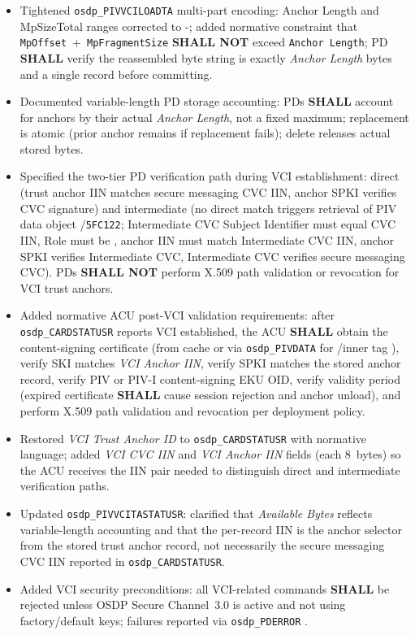 \begin{itemize}
    content-signing X.509 certificate.
  \item Tightened \texttt{osdp\_PIVVCILOADTA} multi-part encoding: Anchor Length and MpSizeTotal
    ranges corrected to -; added normative constraint that
    \texttt{MpOffset}~+~\texttt{MpFragmentSize} \textbf{SHALL NOT} exceed \texttt{Anchor Length}; PD
    \textbf{SHALL} verify the reassembled byte string is exactly \emph{Anchor Length} bytes and a
    single  record before committing.
  \item Documented variable-length PD storage accounting: PDs \textbf{SHALL} account for anchors by
    their actual \emph{Anchor Length}, not a fixed maximum; replacement is atomic (prior anchor
    remains if replacement fails); delete releases actual stored bytes.
  \item Specified the two-tier PD verification path during VCI establishment: direct (trust anchor
    IIN matches secure messaging CVC IIN, anchor SPKI verifies CVC signature) and intermediate (no
    direct match triggers retrieval of PIV data object /\texttt{5FC122}; Intermediate
    CVC Subject Identifier must equal CVC IIN, Role  must be , anchor IIN
    must match Intermediate CVC IIN, anchor SPKI verifies Intermediate CVC, Intermediate CVC
    verifies secure messaging CVC). PDs \textbf{SHALL NOT} perform X.509 path validation or
    revocation for VCI trust anchors.
  \item Added normative ACU post-VCI validation requirements: after \texttt{osdp\_CARDSTATUSR}
    reports VCI established, the ACU \textbf{SHALL} obtain the content-signing certificate (from
    cache or via \texttt{osdp\_PIVDATA} for /inner tag ), verify SKI matches
    \emph{VCI Anchor IIN}, verify SPKI matches the stored anchor record, verify PIV or PIV-I
    content-signing EKU OID, verify validity period (expired certificate \textbf{SHALL} cause
    session rejection and anchor unload), and perform X.509 path validation and revocation per
    deployment policy.
  \item Restored \emph{VCI Trust Anchor ID} to \texttt{osdp\_CARDSTATUSR} with normative language;
    added \emph{VCI CVC IIN} and \emph{VCI Anchor IIN} fields (each 8~bytes) so the ACU receives the
    IIN pair needed to distinguish direct and intermediate verification paths.
  \item Updated \texttt{osdp\_PIVVCITASTATUSR}: clarified that \emph{Available Bytes} reflects
    variable-length accounting and that the per-record IIN is the anchor selector from the stored
    trust anchor record, not necessarily the secure messaging CVC IIN reported in
    \texttt{osdp\_CARDSTATUSR}.
  \item Added VCI security preconditions: all VCI-related commands \textbf{SHALL} be rejected unless
    OSDP Secure Channel~3.0 is active and not using factory/default keys; failures reported via
    \texttt{osdp\_PDERROR} .
\end{itemize}

